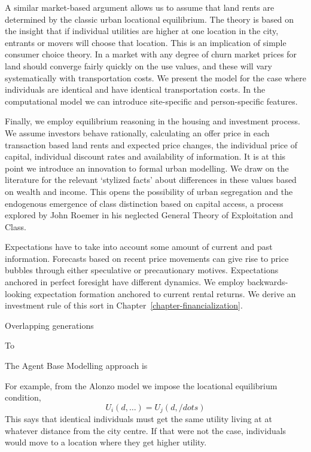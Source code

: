 A similar market-based argument allows us to assume that land rents are determined by the classic urban locational equilibrium. The theory is based on the insight that if individual utilities are higher at one location in the city, entrants or movers will choose that  location. This is an implication of simple consumer choice theory. In a market with any degree of churn market prices for land should converge fairly quickly on the use values, and these will vary systematically with transportation costs. We present the model for the case where individuals are identical and have identical transportation costs. In the computational model we can introduce site-specific and person-specific features. 

Finally, we employ equilibrium reasoning  in the housing and investment process. We assume investors behave rationally, calculating an offer price in each transaction based land rents and expected price changes, the individual price of capital, individual discount rates and availability of  information. It is at this point we introduce an innovation to formal urban modelling.   We draw on the literature for the relevant `stylized facts' about differences in these values based on wealth and income. This opens the possibility of urban segregation and the endogenous emergence of class distinction based on capital access, a process explored by John Roemer in his neglected General Theory of Exploitation and Class.  

Expectations have to take into account some amount of current and past information. Forecasts based on recent price movements can give rise to price bubbles through either speculative or precautionary motives. Expectations anchored in perfect foresight have different dynamics. We employ backwards-looking expectation formation anchored to current rental returns. We derive an investment rule of this sort in Chapter~\ref{chapter-financialization}. 
          
Overlapping generations


To 

   
The Agent Base Modelling approach is 

For example, from the Alonzo model we impose the locational equilibrium condition,
\[U_i(d,\dots)=U_j(d, /dots)\]
This says that identical individuals must get the same utility living at at whatever distance from the city centre. If that were not the case, individuals would move to a location where they get higher utility.

